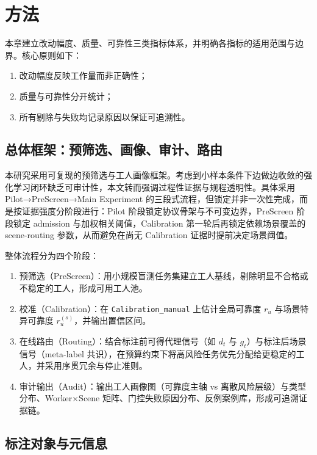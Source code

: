 ﻿\section{方法}

本章建立改动幅度、质量、可靠性三类指标体系，并明确各指标的适用范围与边界。核心原则如下：
\begin{enumerate}
    \item 改动幅度反映工作量而非正确性；
    \item 质量与可靠性分开统计；
    \item 所有剔除与失败均记录原因以保证可追溯性。
\end{enumerate}

\subsection{总体框架：预筛选、画像、审计、路由}

本研究采用可复现的预筛选与工人画像框架。考虑到小样本条件下边做边收敛的强化学习闭环缺乏可审计性，本文转而强调过程性证据与规程透明性。具体采用 Pilot→PreScreen→Main Experiment 的三段式流程，但锁定并非一次性完成，而是按证据强度分阶段进行：Pilot 阶段锁定协议骨架与不可变边界，PreScreen 阶段锁定 admission 与加权相关阈值，Calibration 第一轮后再锁定依赖场景覆盖的 scene-routing 参数，从而避免在尚无 Calibration 证据时提前决定场景阈值。

整体流程分为四个阶段：
\begin{enumerate}
    \item 预筛选（PreScreen）：用小规模盲测任务集建立工人基线，剔除明显不合格或不稳定的工人，形成可用工人池。
    \item 校准（Calibration）：在 \texttt{Calibration\_manual} 上估计全局可靠度 $r_u$ 与场景特异可靠度 $r_u^{\left(s\right)}$，并输出置信区间。
    \item 在线路由（Routing）：结合标注前可得代理信号（如 $d_t$ 与 $g_t$）与标注后场景信号（meta-label 共识），在预算约束下将高风险任务优先分配给更稳定的工人，并采用序贯冗余与停止准则。
    \item 审计输出（Audit）：输出工人画像图（可靠度主轴 vs 离散风险层级）与类型分布、Worker×Scene 矩阵、门控失败原因分布、反例案例库，形成可追溯证据链。
\end{enumerate}




\subsection{标注对象与元信息}

